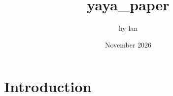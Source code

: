 \documentclass{article}
\title{yaya_paper}
\author{hy lan}
\date{November 2026}
\begin{document}
\maketitle

\section{Introduction}
\end{document}
